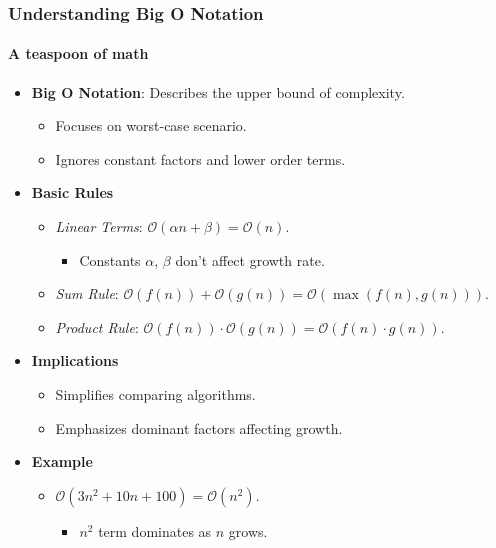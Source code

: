 \documentclass[compress,12pt,bookmark]{beamer}
\begin{document}
\begin{frame}
    \frametitle{Understanding Big O Notation}
    \framesubtitle{A teaspoon of math}

    \begin{itemize}
        \item \textbf{Big O Notation}: Describes the upper bound of complexity.
              \begin{itemize}
                  \item Focuses on worst-case scenario.
                  \item Ignores constant factors and lower order terms.
              \end{itemize}
        \item \textbf{Basic Rules}
              \begin{itemize}
                  \item \textit{Linear Terms}: $\mathcal{O}(\alpha n + \beta) = \mathcal{O}(n)$.
                        \begin{itemize}
                            \item Constants $\alpha$, $\beta$ don't affect growth rate.
                        \end{itemize}
                  \item \textit{Sum Rule}: $\mathcal{O}(f(n)) + \mathcal{O}(g(n)) = \mathcal{O}(\max(f(n), g(n)))$.
                  \item \textit{Product Rule}: $\mathcal{O}(f(n)) \cdot \mathcal{O}(g(n)) = \mathcal{O}(f(n) \cdot g(n))$.
              \end{itemize}
        \item \textbf{Implications}
              \begin{itemize}
                  \item Simplifies comparing algorithms.
                  \item Emphasizes dominant factors affecting growth.
              \end{itemize}
        \item \textbf{Example}
              \begin{itemize}
                  \item $\mathcal{O}(3n^2 + 10n + 100) = \mathcal{O}(n^2)$.
                        \begin{itemize}
                            \item $n^2$ term dominates as $n$ grows.
                        \end{itemize}
              \end{itemize}
    \end{itemize}
\end{frame}
\end{document}
